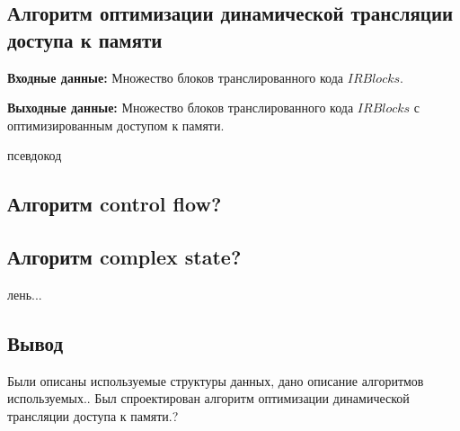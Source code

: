\begin{comment}
{
	+  int State = NOT_CHANGED;
	+  std::set<OrderedNode*> StackNodes;
	+  std::set<OrderedNode*> UnStackNodes;
	+  std::vector<OrderedNode*> Predecessors;
	+  // std::vector<OrderedNode*> Successors;
	+  bool Visited = false;
	+};
+
\end{comment}

\subsection{Алгоритм оптимизации динамической трансляции доступа к памяти}

\textbf{Входные данные:} Множество блоков транслированного кода $IRBlocks$.

\textbf{Выходные данные:} Множество блоков транслированного кода $IRBlocks$ с оптимизированным доступом к памяти.

псевдокод

\subsection{Алгоритм control flow?}

\subsection{Алгоритм complex state?}

лень...

\subsection{Вывод}

Были описаны используемые структуры данных, дано описание алгоритмов используемых.. Был спроектирован алгоритм оптимизации динамической трансляции доступа к памяти.?

\pagebreak